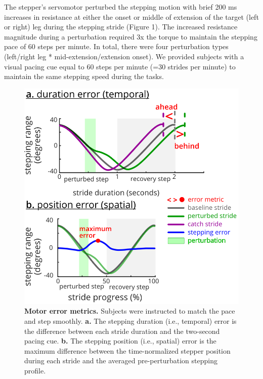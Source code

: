 \documentclass[shortpaper,twoside,web]{ieeecolor}
\begin{document}
The stepper’s servomotor perturbed the stepping motion with brief 200 ms increases in resistance at either the onset or middle of extension of the target (left or right) leg during the stepping stride (Figure 1). The increased resistance magnitude during a perturbation required 3x the torque to maintain the stepping pace of 60 steps per minute. In total, there were four perturbation types (left/right leg * mid-extension/extension onset). We provided subjects with a visual pacing cue equal to 60 steps per minute (=30 strides per minute) to maintain the same stepping speed during the tasks.
\begin{figure}[!t]
\centerline{\includegraphics{figures/02_error_metrics.jpg}}
\caption{\textbf{Motor error metrics.} Subjects were instructed to match the pace and step smoothly. \textbf{a.} The stepping duration (i.e., temporal) error is the difference between each stride duration and the two-second pacing cue. \textbf{b.} The stepping position (i.e., spatial) error is the maximum difference between the time-normalized stepper position during each stride and the averaged pre-perturbation stepping profile.}
\label{fig2}
\end{figure}
\end{document}
